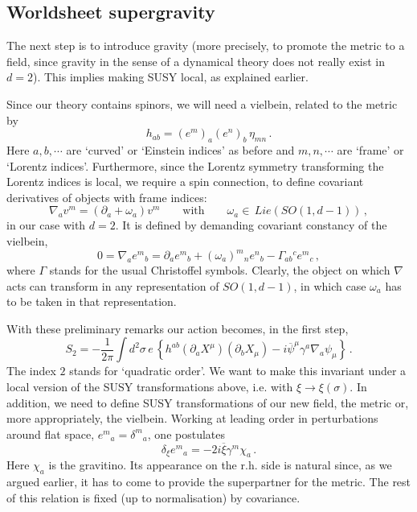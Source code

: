 \documentclass[12pt]{article}
\newcommand{\be}{\begin{equation}}
\newcommand{\ee}{\end{equation}}
\newcommand{\ol}{\overline}
\numberwithin{equation}{section}
\begin{document}
\subsection{Worldsheet supergravity}

The next step is to introduce gravity (more precisely, to promote the metric to a field, since gravity in the sense of a dynamical theory does not really exist in $d=2$). This implies making SUSY local, as explained earlier. 

Since our theory contains spinors, we will need a vielbein, related to the metric by 
\be
h_{ab}=(e^m)_a (e^n)_b\,\eta_{mn}\,.
\ee
Here $a,b,\cdots$ are `curved' or `Einstein indices' as before and $m,n,\cdots$ are `frame' or `Lorentz indices'. Furthermore, since the Lorentz symmetry transforming the Lorentz indices is local, we require a spin connection, to define covariant derivatives of objects with frame indices:
\be
\nabla_a v^m=(\partial_a+\omega_a)v^m\qquad\mbox{with}\qquad \omega_a\in\,
Lie(SO(1,d-1))\,,
\ee
in our case with $d=2$. It is defined by demanding covariant constancy of the vielbein,
\be
0=\nabla_a e^m{}_b=\partial_a e^m{}_b+(\omega_a)^m{}_n e^n{}_b-\Gamma_{ab}{}^c e^m{}_c\,,
\ee
where $\Gamma$ stands for the usual Christoffel symbols. Clearly, the object on which $\nabla$ acts can transform in any representation of $SO(1,d-1)$, in which case $\omega_a$ has to be taken in that representation. 

With these preliminary remarks our action becomes, in the first step,
\be
S_2=-\frac{1}{2\pi}\int d^2\sigma\,e\,\left\{h^{ab}(\partial_a X^\mu) (\partial_b X_\mu) -i\ol{\psi}^\mu\gamma^a\nabla_a\psi_\mu\right\}\,.\label{sga}
\ee
The index $2$ stands for `quadratic order'. We want to make this invariant under a local version of the SUSY transformations above, i.e. with $\xi\to\xi(\sigma)$. In addition, we need to define SUSY transformations of our new field, the metric or, more appropriately, the vielbein. Working at leading order in perturbations around flat space, $e^m{}_a=\delta^m{}_a$, one postulates
\be
\delta_\xi e^m{}_a=-2i\ol{\xi}\gamma^m\chi_a\,.
\ee
Here $\chi_a$ is the gravitino. Its appearance on the r.h. side is natural since, as we argued earlier, it has to come to provide the superpartner for the metric. The rest of this relation is fixed (up to normalisation) by covariance. 
\end{document}
